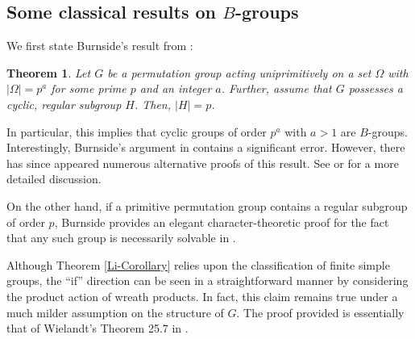 \documentclass[12pt]{amsart}
\newtheorem{theorem}{Theorem}[section]
\theoremstyle{definition}
\begin{document}
	\subsection{Some classical results on $B$-groups}
	
	We first state Burnside's result from \cite[\S252]{Burn}:
	
	\begin{theorem}\label{Burnside-cyclic}
		Let $G$ be a permutation group acting uniprimitively on a set $\Omega$ with $|\Omega| = p^a$ for some prime $p$ and an integer $a$. Further, assume that $G$ possesses a cyclic, regular subgroup $H$. Then, $|H| = p$.
	\end{theorem}
	In particular, this implies that cyclic groups of order $p^a$ with $a > 1$ are $B$-groups. Interestingly, Burnside's argument in \cite[\S252]{Burn} contains a significant error. However, there has since appeared numerous alternative proofs of this result. See \cite{Knapp} or \cite{Wild2} for a more detailed discussion.
	
	On the other hand, if a primitive permutation group contains a regular subgroup of order $p$, Burnside provides an elegant character-theoretic proof for the fact that any such group is necessarily solvable in \cite[\S251]{Burn}.
	
	Although Theorem \ref{Li-Corollary} relies upon the classification of finite simple groups, the ``if'' direction can be seen in a straightforward manner by considering the product action of wreath products. In fact, this claim remains true under a much milder assumption on the structure of $G$. The proof provided is essentially that of Wielandt's Theorem 25.7 in \cite{W}.
	
\end{document}
